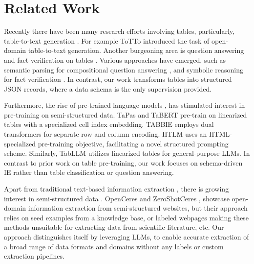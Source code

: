 \documentclass[11pt]{article}
\begin{document}
\section{Related Work}
\label{sec:related}





Recently there have been many research efforts involving tables, particularly, table-to-text generation \citep{parikh2020totto, wang-etal-2022-robust, hu-etal-2023-improving}. For example ToTTo \cite{parikh2020totto} introduced the task of open-domain table-to-text generation. 
Another burgeoning area is question answering and fact verification on tables \citep{jauhar-etal-2016-tables, zhong2017seq2sql, yu-etal-2018-spider, schlichtkrull-etal-2021-joint}. 
Various approaches have emerged, such as semantic parsing for compositional question answering \citep{pasupat2015compositional}, and symbolic reasoning for fact verification \citep{Chen2020TabFact:}.
In contrast, our work transforms tables into structured JSON records, where a data schema is the only supervision provided.




Furthermore, the rise of pre-trained language models \cite{devlin-etal-2019-bert}, has stimulated interest in pre-training on semi-structured data.  TaPas \cite{herzig-etal-2020-tapas} and TaBERT \cite{yin2020tabert} pre-train on linearized tables with a specialized cell index embedding. TABBIE \cite{iida2021tabbie} employs dual transformers for separate row and column encoding. 
HTLM \cite{aghajanyanhtlm} uses an HTML-specialized pre-training objective, facilitating a novel structured prompting scheme. Similarly, TabLLM \citep{pmlr-v206-hegselmann23a} utilizes linearized tables for general-purpose LLMs.  In contrast to prior work on table pre-training, our work focuses on schema-driven IE rather than table classification or question answering.




Apart from traditional text-based information extraction \citep{wadden-etal-2019-entity, bai-etal-2021-pre, tamari-etal-2021-process}, there is growing interest in semi-structured data \citep{33333, lockard2019openceres, dong-etal-2020-multi-modal, kardas-etal-2020-axcell, gupta2022discomat, lou2023s2abel}. 
OpenCeres \cite{lockard2019openceres} and ZeroShotCeres \cite{lockard-etal-2020-zeroshotceres}, showcase open-domain information extraction from semi-structured websites, but their approach relies on seed examples from a knowledge base, or labeled webpages making these methods unsuitable for extracting data from scientific literature, etc.
Our approach distinguishes itself by leveraging LLMs, to enable accurate extraction of a broad range of data formats and domains without any labels or custom extraction pipelines.
\end{document}

